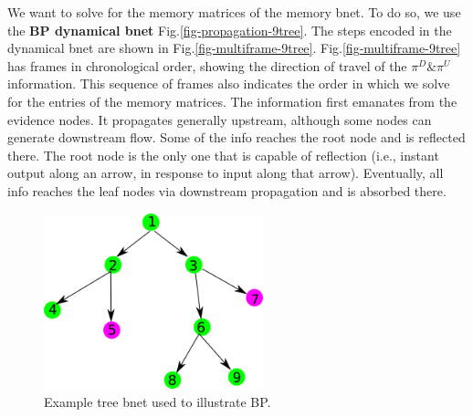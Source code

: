 We want to solve for the
memory matrices of the
memory bnet. To do so,
we use the {\bf BP dynamical bnet}
Fig.\ref{fig-propagation-9tree}.
The steps encoded
in the dynamical bnet
are shown in Fig.\ref{fig-multiframe-9tree}.
Fig.\ref{fig-multiframe-9tree}
has frames in chronological order,
showing the direction of travel
of the $\pi^D\&\pi^U$ information.
This sequence of frames also indicates
the order
in which we solve for the entries of
 the memory matrices.
The information first emanates from the evidence nodes.
It propagates generally upstream,
although some nodes
can generate downstream flow. Some of the
info  reaches the root node and is  reflected there.
The root node is the only one that
is capable of reflection (i.e., instant output
along an arrow,
in response to input along that arrow).
Eventually, all info
reaches the leaf nodes
via downstream propagation and is absorbed there.


\begin{figure}[h!]
\centering
\includegraphics[width=2.5in]
{mpass/mp-9tree.png}
\caption{Example tree bnet
used to illustrate BP.
}
\label{fig-mp-9tree}
\end{figure}



